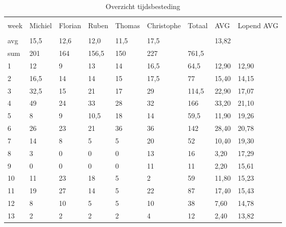 \documentclass[12pt,a4paper]{report}
\begin{document}
\begin{longtable}{|l|l|l|l|l|l|l|l|l|}
\caption{Overzicht tijdsbesteding} \\
\hline \\[-2ex]
  \multicolumn{1}{l}{week } & 
  \multicolumn{1}{l}{Michiel} &
  \multicolumn{1}{l}{Florian} &
  \multicolumn{1}{l}{Ruben} &
  \multicolumn{1}{l}{Thomas}&
  \multicolumn{1}{l}{Christophe}&
  \multicolumn{1}{l}{Totaal}&
  \multicolumn{1}{l}{AVG}&
  \multicolumn{1}{l}{Lopend AVG}
  \\[0.5ex] \hline \\[-1.8ex]
\endfirsthead
avg & 15,5 & 12,6 & 12,0 & 11,5 & 17,5 &  & 13,82 &  \\ 
\hline
sum & 201 & 164 & 156,5 & 150 & 227 & 761,5 &  &  \\ 
\hline
1 & 12 & 9 & 13 & 14 & 16,5 & 64,5 & 12,90 & 12,90 \\ 
\hline
2 & 16,5 & 14 & 14 & 15 & 17,5 & 77 & 15,40 & 14,15 \\ 
\hline
3 & 32,5 & 15 & 21 & 17 & 29 & 114,5 & 22,90 & 17,07 \\ 
\hline
4 & 49 & 24 & 33 & 28 & 32 & 166 & 33,20 & 21,10 \\ 
\hline
5 & 8 & 9 & 10,5 & 18 & 14 & 59,5 & 11,90 & 19,26 \\ 
\hline
6 & 26 & 23 & 21 & 36 & 36 & 142 & 28,40 & 20,78 \\ 
\hline
7 & 14 & 8 & 5 & 5 & 20 & 52 & 10,40 & 19,30 \\ 
\hline
8 & 3 & 0 & 0 & 0 & 13 & 16 & 3,20 & 17,29 \\ 
\hline
9 & 0 & 0 & 0 & 0 & 11 & 11 & 2,20 & 15,61 \\ 
\hline
10 & 11 & 23 & 18 & 5 & 2 & 59 & 11,80 & 15,23 \\ 
\hline
11 & 19 & 27 & 14 & 5 & 22 & 87 & 17,40 & 15,43 \\ 
\hline
12 & 8 & 10 & 5 & 5 & 10 & 38 & 7,60 & 14,78 \\ 
\hline
13 & 2 & 2 & 2 & 2 & 4 & 12 & 2,40 & 13,82 \\ 
\hline
\end{longtable}
\normalsize
\end{document}
